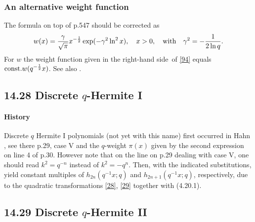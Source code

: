 \documentclass[twoside,11pt]{article}
\newcommand\ga\gamma
\newcommand\half{\frac12}
\newcommand\const{{\rm const.} }
\newcommand\RHS{right-hand side}
\begin{document}
\subsubsection*{An alternative weight function}
The formula on top of p.547 should be corrected as
\begin{equation}
w(x)=\frac\ga{\sqrt\pi} x^{-\half}\exp(-\ga^2\ln^2 x),\quad x>0,\quad
{\rm with}\quad\ga^2=- \frac1{2\ln q} .
\label{94}
\end{equation}
For $w$ the weight function given in  the \RHS\ of \eqref{94}
equals $\const w(q^{-\half}x)$. See also
.
%
\subsection*{14.28 Discrete $q$-Hermite I}
\label{sec14.28}
%
\paragraph{History}
Discrete $q$ Hermite I polynomials (not yet with this name) first occurred in
Hahn , see there p.29, case V and the $q$-weight $\pi(x)$ given by
the second expression on line 4 of p.30. However note that on the line on p.29 dealing with
case V, one should read $k^2=q^{-n}$ instead of $k^2=-q^n$. Then, with the indicated
substitutions,   yield constant multiples of
$h_{2n}(q^{-1}x;q)$ and $h_{2n+1}(q^{-1}x;q)$, respectively,
 due to the quadratic transformations \eqref{28}, \eqref{29} together with  (4.20.1).
%
\subsection*{14.29 Discrete $q$-Hermite II}
\label{sec14.29}
%
\end{document}
